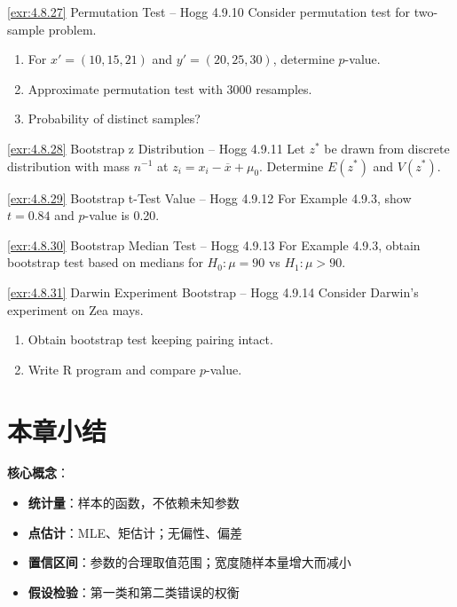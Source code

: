 \begin{exercise}{\ref{exr:4.8.27} Permutation Test – Hogg 4.9.10}\label{exr:4.8.27}
Consider permutation test for two-sample problem.
\begin{enumerate}
\item[(a)] For $x'=(10,15,21)$ and $y'=(20,25,30)$, determine $p$-value.
\item[(b)] Approximate permutation test with 3000 resamples.
\item[(c)] Probability of distinct samples?
\end{enumerate}
\end{exercise}

\begin{exercise}{\ref{exr:4.8.28} Bootstrap z Distribution – Hogg 4.9.11}\label{exr:4.8.28}
Let $z^*$ be drawn from discrete distribution with mass $n^{-1}$ at $z_i = x_i - \overline{x} + \mu_0$. Determine $E(z^*)$ and $V(z^*)$.
\end{exercise}

\begin{exercise}{\ref{exr:4.8.29} Bootstrap t-Test Value – Hogg 4.9.12}\label{exr:4.8.29}
For Example 4.9.3, show $t=0.84$ and $p$-value is 0.20.
\end{exercise}

\begin{exercise}{\ref{exr:4.8.30} Bootstrap Median Test – Hogg 4.9.13}\label{exr:4.8.30}
For Example 4.9.3, obtain bootstrap test based on medians for $H_0: \mu=90$ vs $H_1: \mu>90$.
\end{exercise}

\begin{exercise}{\ref{exr:4.8.31} Darwin Experiment Bootstrap – Hogg 4.9.14}\label{exr:4.8.31}
Consider Darwin's experiment on Zea mays.
\begin{enumerate}
\item[(a)] Obtain bootstrap test keeping pairing intact.
\item[(b)] Write R program and compare $p$-value.
\end{enumerate}
\end{exercise}

\section*{本章小结}

\textbf{核心概念}：
\begin{itemize}
\item \textbf{统计量}：样本的函数，不依赖未知参数
\item \textbf{点估计}：MLE、矩估计；无偏性、偏差
\item \textbf{置信区间}：参数的合理取值范围；宽度随样本量增大而减小
\item \textbf{假设检验}：第一类和第二类错误的权衡
\end{itemize}

